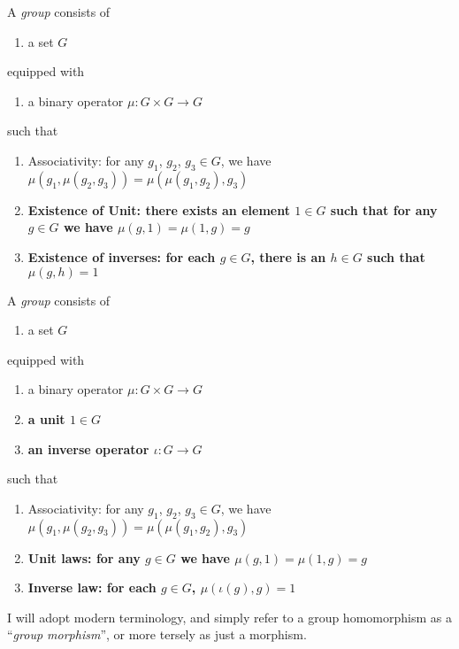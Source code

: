 {\begin{definition}[Version 1]\label{defn:introduction:mizar-style-group}
  A \emph{group} consists of
  \begin{enumerate}
  \item a set $G$
  \end{enumerate}
  equipped with
  \begin{enumerate}
  \item a binary operator $\mu\colon G\times G\to G$
  \end{enumerate}
  such that
  \begin{enumerate}
  \item Associativity: for any $g_{1}$, $g_{2}$, $g_{3}\in G$, we have
    $\mu(g_{1}, \mu(g_{2},g_{3})) = \mu(\mu(g_{1},g_{2}),g_{3})$
  \item \textbf{Existence of Unit: there exists an element $1\in G$ such
    that for any $g\in G$ we have $\mu(g,1)=\mu(1,g)=g$}
  \item \textbf{Existence of inverses: for each $g\in G$, there is an
    $h\in G$ such that $\mu(g,h)=1$}
  \end{enumerate}
\end{definition}

\begin{definition}[Version 2]
  A \emph{group} consists of
  \begin{enumerate}
  \item a set $G$
  \end{enumerate}
  equipped with
  \begin{enumerate}
  \item a binary operator $\mu\colon G\times G\to G$
  \item \textbf{a unit $1\in G$}
  \item \textbf{an inverse operator $\iota\colon G\to G$}
  \end{enumerate}
  such that
  \begin{enumerate}
  \item Associativity: for any $g_{1}$, $g_{2}$, $g_{3}\in G$, we have
    $\mu(g_{1}, \mu(g_{2},g_{3})) = \mu(\mu(g_{1},g_{2}),g_{3})$
  \item \textbf{Unit laws: for any $g\in G$ we have $\mu(g,1)=\mu(1,g)=g$}
  \item \textbf{Inverse law: for each $g\in G$, $\mu(\iota(g),g)=1$}
  \end{enumerate}
\end{definition}

\begin{def-remark}
I will adopt modern terminology, and simply refer to a group
homomorphism as a ``\emph{group morphism}'', or more tersely as just a
morphism.
\end{def-remark}

}
